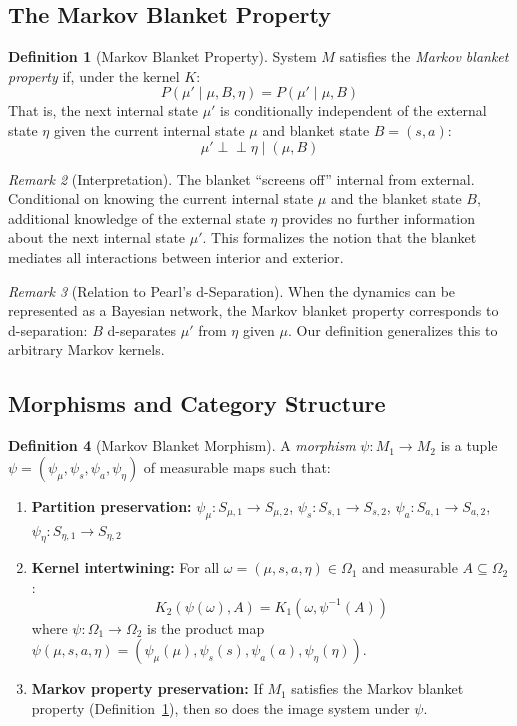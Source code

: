 \documentclass[11pt,a4paper]{article}
\theoremstyle{definition}
\newtheorem{definition}{Definition}[section]
\theoremstyle{plain}
\theoremstyle{remark}
\newtheorem{remark}[definition]{Remark}
\begin{document}
\subsection{The Markov Blanket Property}

\begin{definition}[Markov Blanket Property]\label{def:mb-property}
System $M$ satisfies the \emph{Markov blanket property} if, under the kernel $K$:
\begin{equation}\label{eq:mb-property}
P(\mu' \mid \mu, B, \eta) = P(\mu' \mid \mu, B)
\end{equation}
That is, the next internal state $\mu'$ is conditionally independent of the external state $\eta$ given the current internal state $\mu$ and blanket state $B = (s, a)$:
\[
\mu' \perp\!\!\!\perp \eta \mid (\mu, B)
\]
\end{definition}

\begin{remark}[Interpretation]
The blanket ``screens off'' internal from external. Conditional on knowing the current internal state $\mu$ and the blanket state $B$, additional knowledge of the external state $\eta$ provides no further information about the next internal state $\mu'$. This formalizes the notion that the blanket mediates all interactions between interior and exterior.
\end{remark}

\begin{remark}[Relation to Pearl's d-Separation]
When the dynamics can be represented as a Bayesian network, the Markov blanket property corresponds to d-separation: $B$ d-separates $\mu'$ from $\eta$ given $\mu$. Our definition generalizes this to arbitrary Markov kernels.
\end{remark}

\subsection{Morphisms and Category Structure}

\begin{definition}[Markov Blanket Morphism]\label{def:mb-morphism}
A \emph{morphism} $\psi: M_1 \to M_2$ is a tuple $\psi = (\psi_\mu, \psi_s, \psi_a, \psi_\eta)$ of measurable maps such that:
\begin{enumerate}[label=(\roman*)]
    \item \textbf{Partition preservation:} $\psi_\mu: S_{\mu,1} \to S_{\mu,2}$, $\psi_s: S_{s,1} \to S_{s,2}$, $\psi_a: S_{a,1} \to S_{a,2}$, $\psi_\eta: S_{\eta,1} \to S_{\eta,2}$
    \item \textbf{Kernel intertwining:} For all $\omega = (\mu, s, a, \eta) \in \Omega_1$ and measurable $A \subseteq \Omega_2$:
    \[
    K_2(\psi(\omega), A) = K_1(\omega, \psi^{-1}(A))
    \]
    where $\psi: \Omega_1 \to \Omega_2$ is the product map $\psi(\mu, s, a, \eta) = (\psi_\mu(\mu), \psi_s(s), \psi_a(a), \psi_\eta(\eta))$.
    \item \textbf{Markov property preservation:} If $M_1$ satisfies the Markov blanket property (Definition~\ref{def:mb-property}), then so does the image system under $\psi$.
\end{enumerate}
\end{definition}
\end{document}
